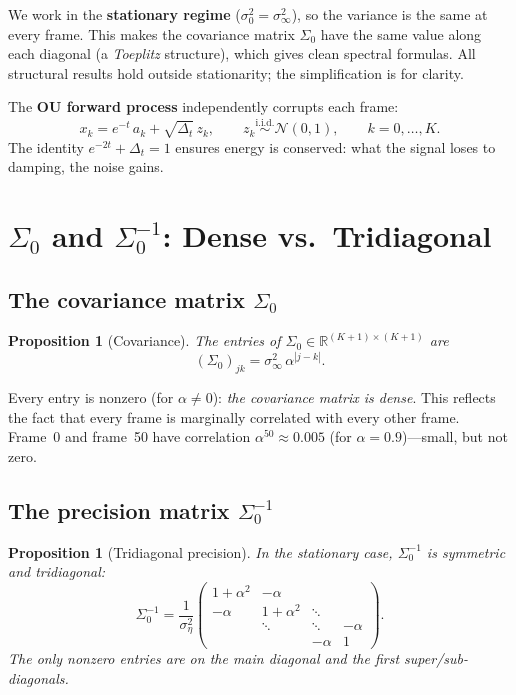 \documentclass[11pt,a4paper]{article}
\newtheorem{proposition}[theorem]{Proposition}
\theoremstyle{definition}
\newcommand{\R}{\mathbb{R}}
\newcommand{\Dt}{\Delta_t}
\newcommand{\se}{\sigma_\eta^2}
\newcommand{\sz}{\sigma_0^2}
\newcommand{\sinf}{\sigma_\infty^2}
\begin{document}
We work in the \textbf{stationary regime} ($\sz = \sinf$), so the variance is the same at every frame.
This makes the covariance matrix $\Sigma_0$ have the same value along each diagonal (a \emph{Toeplitz} structure), which gives clean spectral formulas.
All structural results hold outside stationarity; the simplification is for clarity.

The \textbf{OU forward process} independently corrupts each frame:
\begin{equation}\label{eq:ou}
  x_k = e^{-t}\,a_k + \sqrt{\Dt}\,z_k, \qquad z_k \overset{\text{i.i.d.}}{\sim}\mathcal{N}(0,1), \qquad k = 0,\dots,K.
\end{equation}
The identity $e^{-2t} + \Dt = 1$ ensures energy is conserved: what the signal loses to damping, the noise gains.


\section{$\Sigma_0$ and $\Sigma_0^{-1}$: Dense vs.\ Tridiagonal}
\label{sec:clean}

\subsection{The covariance matrix $\Sigma_0$}

\begin{proposition}[Covariance]\label{prop:cov}
The entries of $\Sigma_0 \in \R^{(K+1)\times(K+1)}$ are
\begin{equation}\label{eq:sigma0}
  (\Sigma_0)_{jk} = \sinf\,\alpha^{|j-k|}.
\end{equation}
\end{proposition}

Every entry is nonzero (for $\alpha \neq 0$): \emph{the covariance matrix is dense}.
This reflects the fact that every frame is marginally correlated with every other frame.
Frame~0 and frame~50 have correlation $\alpha^{50} \approx 0.005$ (for $\alpha = 0.9$)---small, but not zero.

\subsection{The precision matrix $\Sigma_0^{-1}$}

\begin{proposition}[Tridiagonal precision]\label{prop:prec0}
In the stationary case, $\Sigma_0^{-1}$ is symmetric and tridiagonal:
\begin{equation}\label{eq:prec0}
  \Sigma_0^{-1} = \frac{1}{\se}\!\begin{pmatrix}
    1+\alpha^2 & -\alpha & & \\
    -\alpha & 1+\alpha^2 & \ddots & \\
     & \ddots & \ddots & -\alpha \\
     & & -\alpha & 1
  \end{pmatrix}.
\end{equation}
The only nonzero entries are on the main diagonal and the first super/sub-diagonals.
\end{proposition}
\end{document}
